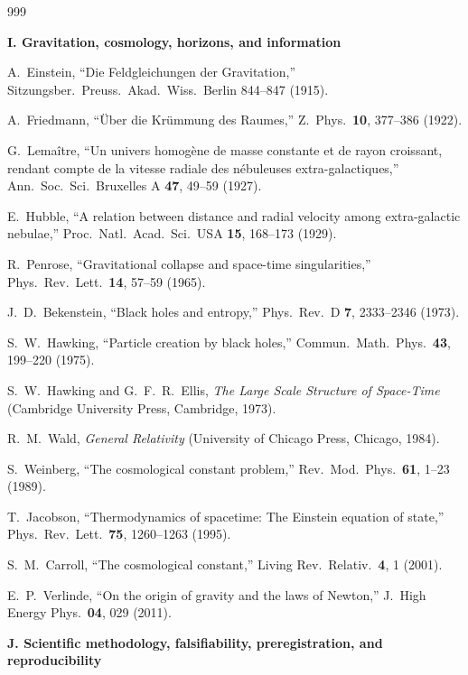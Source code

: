\begin{thebibliography}{999}
\item[]\textbf{I. Gravitation, cosmology, horizons, and information}

A.~Einstein,
``Die Feldgleichungen der Gravitation,''
Sitzungsber.\ Preuss.\ Akad.\ Wiss.\ Berlin 844--847 (1915).

A.~Friedmann,
``\"Uber die Kr\"ummung des Raumes,''
Z.\ Phys.\ \textbf{10}, 377--386 (1922).

G.~Lema\^itre,
``Un univers homog\`ene de masse constante et de rayon croissant, rendant
compte de la vitesse radiale des n\'ebuleuses extra-galactiques,''
Ann.\ Soc.\ Sci.\ Bruxelles A \textbf{47}, 49--59 (1927).

E.~Hubble,
``A relation between distance and radial velocity among extra-galactic
nebulae,'' Proc.\ Natl.\ Acad.\ Sci.\ USA \textbf{15}, 168--173 (1929).

R.~Penrose,
``Gravitational collapse and space-time singularities,''
Phys.\ Rev.\ Lett.\ \textbf{14}, 57--59 (1965).

J.~D.~Bekenstein,
``Black holes and entropy,'' Phys.\ Rev.\ D \textbf{7}, 2333--2346 (1973).

S.~W.~Hawking,
``Particle creation by black holes,''
Commun.\ Math.\ Phys.\ \textbf{43}, 199--220 (1975).

S.~W.~Hawking and G.~F.~R.~Ellis,
\emph{The Large Scale Structure of Space-Time}
(Cambridge University Press, Cambridge, 1973).

R.~M.~Wald,
\emph{General Relativity}
(University of Chicago Press, Chicago, 1984).

S.~Weinberg,
``The cosmological constant problem,''
Rev.\ Mod.\ Phys.\ \textbf{61}, 1--23 (1989).

T.~Jacobson,
``Thermodynamics of spacetime: The Einstein equation of state,''
Phys.\ Rev.\ Lett.\ \textbf{75}, 1260--1263 (1995).

S.~M.~Carroll,
``The cosmological constant,''
Living Rev.\ Relativ.\ \textbf{4}, 1 (2001).

E.~P.~Verlinde,
``On the origin of gravity and the laws of Newton,''
J.\ High Energy Phys.\ \textbf{04}, 029 (2011).

\item[]\textbf{J. Scientific methodology, falsifiability, preregistration, and reproducibility}


\end{thebibliography}
